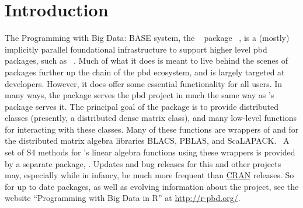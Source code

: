 \section[]{Introduction}
\label{sec:introduction}

The Programming with Big Data:  BASE system, the ~\citep{Rcore} package ~\citep{Schmidt2012pbdBASEpackage}, is a (mostly) implicitly parallel foundational infrastructure to support higher level pbd packages, such as ~\citep{Schmidt2012pbdDMATpackage}.  Much of what it does is meant to live behind the scenes of packages further up the chain of the pbd ecosystem, and is largely targeted at developers.  However, it does offer some essential functionality for all users.
\np
In many ways, the  package serves the pbd project in much the same way as 's  package serves it.  The principal goal of the  package is to provide distributed classes (presently, a distributed dense matrix class), and many low-level functions for interacting with these classes.  Many of these functions are wrappers of and for the distributed matrix algebra libraries BLACS, PBLAS, and ScaLAPACK.~\citep{slug}  A set of S4 methods for 's linear algebra functions using these wrappers is provided by a separate package, .
\np
Updates and bug releases for this and other  projects may, especially while in infancy, be much more frequent than \href{http://cran.r-project.org/}{CRAN} releases.  So for up to date packages, as well as evolving information about the  project,  see the website ``Programming with Big Data in R'' at \href{http://r-pbd.org/}{http://r-pbd.org/}.

